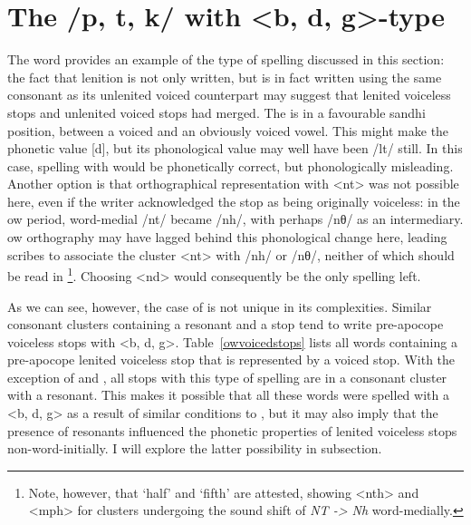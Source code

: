 \section{The /p, t, k/ with <b, d, g>-type}
\label{ptkwithbdg}
The word  provides an example of the type of spelling discussed in this section: the fact that lenition is not only written, but is in fact written using the same consonant as its unlenited voiced counterpart  may suggest that lenited voiceless stops and unlenited voiced stops had merged.  The  is in a favourable sandhi position, between a voiced  and an obviously voiced vowel. This might make the phonetic value [d], but its phonological value may well have been /\gls{l}t/ still. In this case, spelling  with  would be phonetically correct, but phonologically misleading. Another option is that orthographical representation with <nt> was not possible here, even if the writer acknowledged the stop as being originally voiceless: in the \gls{ow} period, word-medial /nt/ became /nh/, with perhaps /nθ/ as an intermediary. \gls{ow} orthography may have lagged behind this phonological change here, leading scribes to associate the cluster <nt> with /nh/ or /nθ/, neither of which should be read in \footnote{Note, however, that  `half' and  `fifth' are attested, showing <nth> and <mph> for clusters undergoing the sound shift of \textit{NT -> Nh} word-medially.}. Choosing <nd> would consequently be the only spelling left. 

As we can see, however, the case of  is not unique in its complexities. Similar consonant clusters containing a resonant and a stop tend to write pre-apocope voiceless stops with <b, d, g>. Table~\ref{owvoicedstops} lists all words containing a pre-apocope lenited voiceless stop that is represented by a voiced stop. With the exception of  and , all stops with this type of spelling are in a consonant cluster with a resonant. This makes it possible that all these words were spelled with a <b, d, g> as a result of similar conditions to , but it may also imply that the presence of resonants influenced the phonetic properties of lenited voiceless stops non-word-initially. I will explore the latter possibility in subsection.

